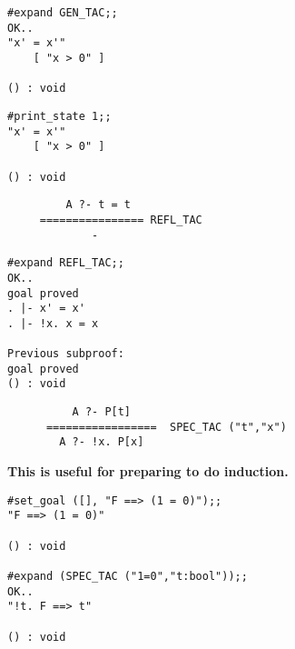 \vskip4mm
\begin{session}\begin{verbatim}
#expand GEN_TAC;;
OK..
"x' = x'"
    [ "x > 0" ]

() : void
\end{verbatim}\end{session}


\vskip4mm
\begin{session}\begin{verbatim}
#print_state 1;;
"x' = x'"
    [ "x > 0" ]

() : void
\end{verbatim}\end{session}
\vskip4mm
\vskip7mm
{\Large\begin{verbatim}
         A ?- t = t
     ================ REFL_TAC
             -
\end{verbatim}}
\vskip2mm
\vskip4mm
\begin{session}\begin{verbatim}
#expand REFL_TAC;;
OK..
goal proved
. |- x' = x'
. |- !x. x = x

Previous subproof:
goal proved
() : void
\end{verbatim}\end{session}



\vskip7mm
{\Large\begin{verbatim}
          A ?- P[t]
      =================  SPEC_TAC ("t","x")
        A ?- !x. P[x]
\end{verbatim}}
\bpindent\LARGE\bf
This is useful for preparing to do induction.
\epindent


\vskip4mm
\begin{session}\begin{verbatim}
#set_goal ([], "F ==> (1 = 0)");;
"F ==> (1 = 0)"

() : void

#expand (SPEC_TAC ("1=0","t:bool"));;
OK..
"!t. F ==> t"

() : void
\end{verbatim}\end{session}

